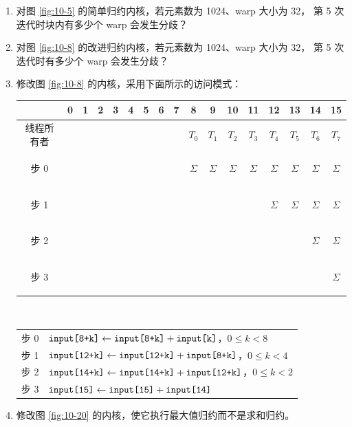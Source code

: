 \begin{enumerate}[label=\arabic*.,leftmargin=2.7em]
  \item 对图 \ref{fig:10-5} 的简单归约内核，若元素数为 1024、warp 大小为 32，
  第 5 次迭代时块内有多少个 warp 会发生分歧？

  \item 对图 \ref{fig:10-8} 的改进归约内核，若元素数为 1024、warp 大小为 32，
  第 5 次迭代时有多少个 warp 会发生分歧？

  \item 修改图 \ref{fig:10-8} 的内核，采用下面所示的访问模式：

  \begin{center}
  \scriptsize
  \setlength{\tabcolsep}{2.2pt}
  \begin{tabular}{c|*{16}{c}}
    &0&1&2&3&4&5&6&7&8&9&10&11&12&13&14&15\\\hline
    线程所有者&&&&&&&&&$T_0$&$T_1$&$T_2$&$T_3$&$T_4$&$T_5$&$T_6$&$T_7$\\
    步 0&&&&&&&&&\colorbox{blue!25}{\strut$\Sigma$}&\colorbox{blue!25}{\strut$\Sigma$}&
      \colorbox{blue!25}{\strut$\Sigma$}&\colorbox{blue!25}{\strut$\Sigma$}&
      \colorbox{blue!25}{\strut$\Sigma$}&\colorbox{blue!25}{\strut$\Sigma$}&
      \colorbox{blue!25}{\strut$\Sigma$}&\colorbox{blue!25}{\strut$\Sigma$}\\
    步 1&&&&&&&&&&&&&\colorbox{blue!25}{\strut$\Sigma$}&
      \colorbox{blue!25}{\strut$\Sigma$}&\colorbox{blue!25}{\strut$\Sigma$}&
      \colorbox{blue!25}{\strut$\Sigma$}\\
    步 2&&&&&&&&&&&&&&&\colorbox{blue!25}{\strut$\Sigma$}&
      \colorbox{blue!25}{\strut$\Sigma$}\\
    步 3&&&&&&&&&&&&&&&&\colorbox{blue!25}{\strut$\Sigma$}
  \end{tabular}
  \\[0.35em]
  \begin{tabular}{c@{\quad}l}
    步 0 & $\code{input[8+k]}\leftarrow\code{input[8+k]}+\code{input[k]}$，$0\le k<8$\\
    步 1 & $\code{input[12+k]}\leftarrow\code{input[12+k]}+\code{input[8+k]}$，$0\le k<4$\\
    步 2 & $\code{input[14+k]}\leftarrow\code{input[14+k]}+\code{input[12+k]}$，$0\le k<2$\\
    步 3 & $\code{input[15]}\leftarrow\code{input[15]}+\code{input[14]}$
  \end{tabular}
  \end{center}

  \item 修改图 \ref{fig:10-20} 的内核，使它执行最大值归约而不是求和归约。


\end{enumerate}
